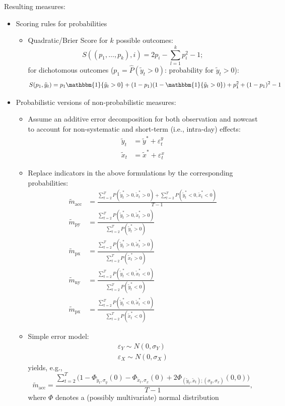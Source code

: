 \documentclass[oneside]{article}
\theoremstyle{plain}%
\theoremstyle{definition}
\newcommand{\ind}[1]{\mathbbm{1}\{#1\}}
\newcommand{\ydiff}{\tilde{y}}
\newcommand{\ydifft}{\tilde{y}^*}
\newcommand{\xdiff}{\tilde{x}}
\newcommand{\xdifft}{\tilde{x}^*}
\newcommand{\Prob}[1]{P(#1)}
\newcommand{\mprob}{\tilde{m}}
\begin{document}
Resulting measures:
\begin{itemize}
  \item Scoring rules for probabilities

\begin{itemize}
  \item Quadratic/Brier Score for $k$ possible outcomes: \begin{equation}
  S((p_1, \dots, p_k), i) = 2 p_i - \sum_{l=1}^k p_i^2 - 1;
\end{equation}
for dichotomous outcomes ($p_1 = \hat{P}(\ydiff_t > 0)$: probability for $\ydiff_t > 0$):
\begin{equation}
  S(p_1, \ydiff_t) = p_1 \ind{\ydiff_t > 0} + (1 - p_1) (1 - \ind{\ydiff_t > 0}) + p_1^2 + (1-p_1)^2 - 1
\end{equation}
\end{itemize}
\item Probabilistic versions of non-probabilistic measures:
\begin{itemize}
  \item Assume an additive error decomposition for both observation and nowcast to account for non-systematic and short-term (i.e., intra-day) effects:
  	\begin{align}
  		\ydiff_t &= \ydifft + \varepsilon_t^y \\
  		\xdiff_t &= \xdifft + \varepsilon_t^x
	\end{align}
\item  Replace indicators in the above formulations by the corresponding probabilities:
\begin{align}
		\mprob_{\text{acc}} &= \frac{\sum_{t=2}^T \Prob{ \ydifft_t > 0, \xdifft_t > 0} + \sum_{t=2}^T \Prob{\ydifft_t < 0, \xdifft_t < 0}}{T-1}  \\
   \mprob_{\text{py}} &= \frac{\sum_{t=2}^T \Prob{\ydifft_t > 0, \xdifft_t > 0}}{\sum_{t=2}^T \Prob{\ydifft_t > 0}} \\
    \mprob_{\text{px}} &= \frac{\sum_{t=2}^T \Prob{\ydifft_t > 0, \xdifft_t > 0}}{\sum_{t=2}^T \Prob{\xdifft_t > 0}} \\
    \mprob_{\text{ny}} &= \frac{\sum_{t=2}^T \Prob{\ydifft_t < 0, \xdifft_t < 0}}{\sum_{t=2}^T \Prob{\ydifft_t < 0}} \\
    \mprob_{\text{px}} &= \frac{\sum_{t=2}^T \Prob{\ydifft_t < 0, \xdifft_t < 0}}{\sum_{t=2}^T \Prob{\xdifft_t < 0}} 
\end{align}
\item Simple error model:
  \begin{align}
	  \varepsilon_Y \sim N(0, \sigma_Y) \\
	  \varepsilon_X \sim N(0, \sigma_X)
  \end{align}
  yields, e.g.,
  	\begin{equation}
  		\mprob_{\text{acc}} = \frac{\sum_{t=2}^T  \big( 1 - \Phi_{\ydiff_t, \sigma_y}(0) - \Phi_{\xdiff_t, \sigma_x} (0) + 2 \Phi_{(\ydiff_t, \xdiff_t); (\sigma_y, \sigma_x)}( 0, 0) \big) }{T-1}, 
	\end{equation}
	where $\Phi$ denotes a (possibly multivariate) normal distribution
\end{itemize}
\end{itemize}
\end{document}

